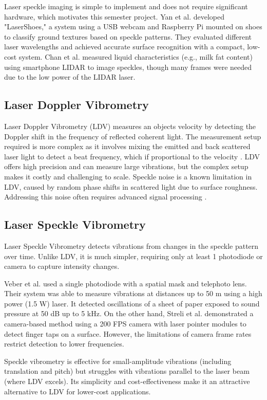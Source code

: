 Laser speckle imaging is simple to implement and does not require significant hardware, which motivates this semester project.
Yan et al. \cite{lasershoes} developed "LaserShoes," a system using a USB webcam and Raspberry Pi mounted on shoes to classify ground textures based on speckle patterns.
They evaluated different laser wavelengths and achieved accurate surface recognition with a compact, low-cost system. 
Chan et al. \cite{milkdrop} measured liquid characteristics (e.g., milk fat content) using smartphone LIDAR to image speckles, 
though many frames were needed due to the low power of the LIDAR laser.


\subsection{Laser Doppler Vibrometry}

Laser Doppler Vibrometry (LDV) measures an objects velocity by detecting the Doppler shift in the frequency of reflected coherent light. 
The measurement setup required is more complex as it involves mixing the emitted and back scattered laser light to detect a beat frequency, 
which if proportional to the velocity \cite{LDVreview}. LDV offers high precision and can measure large vibrations, but the complex setup makes it costly and challenging to scale. 
Speckle noise is a known limitation in LDV, caused by random phase shifts in scattered light due to surface roughness. 
Addressing this noise often requires advanced signal processing \cite{LDVreview}.

\subsection{Laser Speckle Vibrometry}

Laser Speckle Vibrometry detects vibrations from changes in the speckle pattern over time. 
Unlike LDV, it is much simpler, requiring only at least 1 photodiode or camera to capture intensity changes.

Veber et al. \cite{veber2011laserMASK} used a single photodiode with a spatial mask and telephoto lens. 
Their system was able to measure vibrations at distances up to 50 m using a high power (1.5 W) laser. 
It detected oscillations of a sheet of paper exposed to sound pressure at 50 dB up to 5 kHz. On the other hand, 
Streli et al. \cite{structured-light-speckle} demonstrated a camera-based method using a 200 FPS camera with laser 
pointer modules to detect finger taps on a surface. However, the limitations of camera frame rates restrict detection to lower frequencies.

Speckle vibrometry is effective for small-amplitude vibrations (including translation and pitch) but struggles with vibrations parallel 
to the laser beam (where LDV excels). Its simplicity and cost-effectiveness make it an attractive alternative to LDV for lower-cost applications.